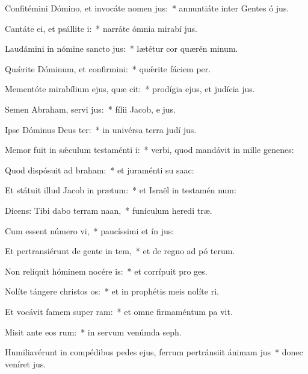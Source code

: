 \item Confitémini Dómino, et invocáte nomen jus:~* annuntiáte inter Gentes ó jus.
\item Cantáte ei, et psállite i:~* narráte ómnia mirabí jus.
\item Laudámini in nómine sancto jus:~* lætétur cor quærén minum.
\item Quǽrite Dóminum, et confirmini:~* quǽrite fáciem  per.
\item Mementóte mirabílium ejus, quæ cit:~* prodígia ejus, et judícia  jus.
\item Semen Abraham, servi jus:~* fílii Jacob, e jus.
\item Ipse Dóminus Deus ter:~* in univérsa terra judí jus.
\item Memor fuit in sǽculum testaménti i:~* verbi, quod mandávit in mille genenes:
\item Quod dispósuit ad braham:~* et juraménti su  saac:
\item Et státuit illud Jacob in prætum:~* et Israël in testamén num:
\item Dicens: Tibi dabo terram naan,~* funículum heredi træ.
\item Cum essent número vi,~* paucíssimi et ín jus:
\item Et pertransiérunt de gente in tem,~* et de regno ad pó terum.
\item Non relíquit hóminem nocére is:~* et corrípuit pro  ges.
\item Nolíte tángere christos os:~* et in prophétis meis nolíte ri.
\item Et vocávit famem super ram:~* et omne firmaméntum pa vit.
\item Misit ante eos rum:~* in servum venúmda  seph.
\item Humiliavérunt in compédibus pedes ejus, ferrum pertránsiit ánimam jus~* donec veníret  jus.
